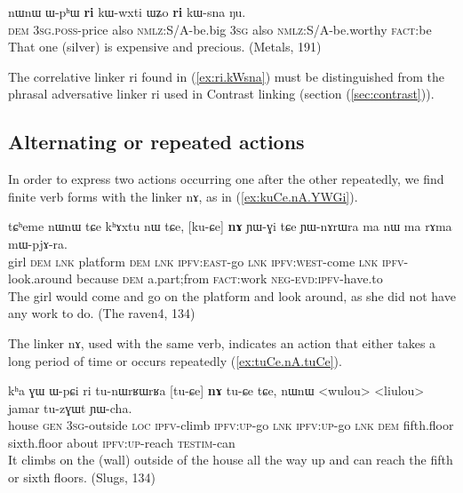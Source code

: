 \documentclass[oldfontcommands,oneside,a4paper,11pt]{article}
\newcommand{\ipa}[1]{{\phon \mbox{#1}}} %
\newcommand{\refb}[1]{(\ref{#1})}
\begin{document}
 \begin{exe}
\ex \label{ex:ri.kWsna}
\gll
\ipa{nɯnɯ}  	\ipa{ɯ-pʰɯ}  	\ipa{\textbf{ri}}  	\ipa{kɯ-wxti}  	\ipa{ɯʑo}  	\ipa{\textbf{ri}}  	\ipa{kɯ-sna}  	\ipa{ŋu.}  \\
\textsc{dem} \textsc{3sg.poss}-price also \textsc{nmlz:S/A}-be.big \textsc{3sg} also \textsc{nmlz:S/A}-be.worthy \textsc{fact}:be \\
\glt That one (silver) is expensive and precious. (Metals, 191)
\end{exe}

The correlative linker \ipa{ri} found in \refb{ex:ri.kWsna} must be distinguished from the phrasal adversative linker \ipa{ri} used in Contrast linking (section \refb{sec:contrast}).




\subsection{Alternating or repeated actions} \label{sec:alternating}

In order to express two actions occurring one after the other repeatedly, we find finite verb forms with the linker \ipa{nɤ}, as in \refb{ex:kuCe.nA.YWGi}.

\begin{exe}
\ex \label{ex:kuCe.nA.YWGi}
\gll
\ipa{tɕʰeme}  	\ipa{nɯnɯ}  	\ipa{tɕe}  	\ipa{kʰɤxtu}  	\ipa{nɯ}  	\ipa{tɕe,}  	[\ipa{ku-ɕe}]  	\ipa{\textbf{nɤ}}  	\ipa{ɲɯ-ɣi}  	\ipa{tɕe}  	\ipa{ɲɯ-nɤrɯra}  	\ipa{ma}  	\ipa{nɯ}  	\ipa{ma}  	\ipa{rɤma}  	\ipa{mɯ-pjɤ-ra.}  \\
girl \textsc{dem} \textsc{lnk} platform \textsc{dem} \textsc{lnk} \textsc{ipfv:east}-go \textsc{lnk} \textsc{ipfv:west}-come \textsc{lnk} \textsc{ipfv}-look.around because \textsc{dem} a.part;from \textsc{fact}:work \textsc{neg-evd:ipfv}-have.to \\ 
\glt The girl would come and go on the platform and look around, as she did not have any work to do. (The raven4, 134)
\end{exe}


The linker \ipa{nɤ}, used with the same verb, indicates an action that either takes a long period of time or occurs repeatedly \refb{ex:tuCe.nA.tuCe}.
\begin{exe}
\ex \label{ex:tuCe.nA.tuCe}
\gll
\ipa{kʰa}  	\ipa{ɣɯ}  	\ipa{ɯ-pɕi}  	\ipa{ri}  	\ipa{tu-nɯrʁɯrʁa}  	[\ipa{tu-ɕe}]  	\ipa{\textbf{nɤ}}  	\ipa{tu-ɕe}  	\ipa{tɕe,}  	\ipa{nɯnɯ}  	<wulou>  	<liulou>  	\ipa{jamar}  	\ipa{tu-zɣɯt}  	\ipa{ɲɯ-cha.}  \\
house \textsc{gen} \textsc{3sg}-outside \textsc{loc} \textsc{ipfv}-climb \textsc{ipfv:up}-go \textsc{lnk} \textsc{ipfv:up}-go \textsc{lnk} \textsc{dem} fifth.floor sixth.floor about \textsc{ipfv:up}-reach \textsc{testim}-can \\
\glt It climbs on the (wall) outside of the house all the way up and can reach the fifth or   sixth floors.
(Slugs, 134)
\end{exe}
 
\end{document}
